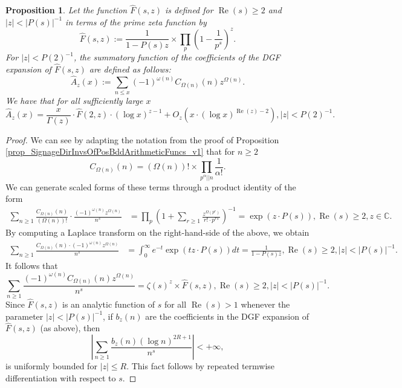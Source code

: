 \documentclass[11pt,reqno,a4letter]{article}
\numberwithin{figure}{section}
\numberwithin{table}{section}
\theoremstyle{plain}
\newtheorem{prop}[theorem]{Proposition}
\numberwithin{theorem}{section}
\theoremstyle{definition}
\renewcommand{\Re}{\operatorname{Re}}
\begin{document}
\begin{prop} 
\label{prop_HatAzx_ModSummatoryFuncExps_RelatedToCkn} 
Let the function $\widehat{F}(s, z)$ is defined for $\Re(s) \geq 2$ and $|z| < |P(s)|^{-1}$ 
in terms of the prime zeta function by 
\[
\widehat{F}(s, z) := \frac{1}{1-P(s) z} 
     \times \prod_p \left(1 - \frac{1}{p^s}\right)^{z}. 
\]
For $|z| < P(2)^{-1}$, the summatory function of the coefficients of the 
DGF expansion of $\widehat{F}(s, z)$ are defined as follows: 
\[
\widehat{A}_z(x) := \sum_{n \leq x} (-1)^{\omega(n)} 
     C_{\Omega(n)}(n) z^{\Omega(n)}. 
\]
We have that for all sufficiently large $x$ 
\[
\widehat{A}_z(x) = \frac{x}{\Gamma(z)} \cdot \widehat{F}(2, z) \cdot (\log x)^{z-1} + 
     O_{z}\left(x \cdot (\log x)^{\Re(z) - 2}\right), |z| < P(2)^{-1}. 
\]
\end{prop} 
\begin{proof} 
We can see by adapting the notation from the proof of 
Proposition \ref{prop_SignageDirInvsOfPosBddArithmeticFuncs_v1} 
that for $n \geq 2$ 
\[
C_{\Omega(n)}(n) = (\Omega(n))! \times \prod_{p^{\alpha}||n} \frac{1}{\alpha!}. 
\]
We can generate scaled forms of these terms through a product identity of the form 
\begin{align*} 
\sum_{n \geq 1} \frac{C_{\Omega(n)}(n)}{(\Omega(n))!} \cdot 
     \frac{(-1)^{\omega(n)} z^{\Omega(n)}}{n^s} & = \prod_p \left(1 + \sum_{r \geq 1} 
     \frac{z^{\Omega(p^r)}}{r! \cdot p^{rs}}\right)^{-1} 
     = \exp\left(z \cdot P(s)\right), \Re(s) \geq 2, z \in \mathbb{C}. 
\end{align*} 
By computing a Laplace transform on the right-hand-side of the above, we obtain 
\begin{align*} 
\sum_{n \geq 1} \frac{C_{\Omega(n)}(n) \cdot (-1)^{\omega(n)} z^{\Omega(n)}}{n^s} & = 
     \int_0^{\infty} e^{-t} \exp\left(tz \cdot P(s)\right) dt = \frac{1}{1 - P(s) z}, 
     \Re(s) \geq 2, |z| < |P(s)|^{-1}. 
\end{align*} 
It follows that 
\[
\sum_{n \geq 1} \frac{(-1)^{\omega(n)} C_{\Omega(n)}(n) z^{\Omega(n)}}{n^s} = 
     \zeta(s)^z \times \widehat{F}(s, z), \Re(s) \geq 2, |z| < |P(s)|^{-1}. 
\]
Since $\widehat{F}(s, z)$ is an analytic function of $s$ for all $\Re(s) > 1$ 
whenever the parameter $|z| < |P(s)|^{-1}$, 
if $b_z(n)$ are the coefficients in the DGF expansion of $\widehat{F}(s, z)$ (as above), then 
\[
\left\lvert \sum_{n \geq 1} \frac{b_z(n) (\log n)^{2R+1}}{n^s} \right\rvert < +\infty, 
\]
is uniformly bounded for $|z| \leq R$. This fact follows by repeated termwise differentiation 
with respect to $s$. 


\end{proof}
\end{document}
